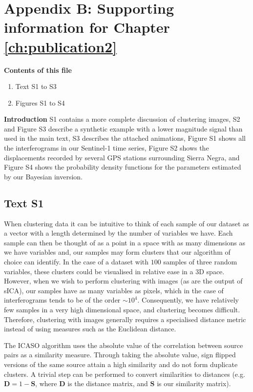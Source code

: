 \onehalfspacing
\chapter*{Appendix B: Supporting information for Chapter \ref{ch:publication2}}


\noindent\textbf{Contents of this file}
\begin{enumerate}
\item Text S1 to S3
\item Figures S1 to S4
\end{enumerate}



\noindent\textbf{Introduction}
S1 contains a more complete discussion of clustering images, S2 and Figure S3 describe a synthetic example with a lower magnitude signal than used in the main text, S3 describes the attached animations, Figure S1 shows all the interferograms in our Sentinel-1 time series, Figure S2 shows the displacements recorded by several GPS stations surrounding Sierra Negra, and Figure S4 shows the probability density functions for the parameters estimated by our Bayesian inversion. 

\section*{Text S1}

When clustering data it can be intuitive to think of each sample of our dataset as a vector with a length determined by the number of variables we have.  Each sample can then be thought of as a point in a space with as many dimensions as we have variables and, our samples may form clusters that our algorithm of choice can identify.  In the case of a dataset with $100$ samples of three random variables, these clusters could be visualised in relative ease in a $3$D space.  However, when we wish to perform clustering with images (as are the output of sICA), our samples have as many variables as pixels, which in the case of interferograms tends to be  of the order $\sim10^{4}$.  Consequently, we have relatively few samples in a very high dimensional space, and clustering becomes difficult.  Therefore, clustering with images generally requires a specialised distance metric instead of using measures such as the Euclidean distance.  

The ICASO algorithm uses the absolute value of the correlation between source pairs as a similarity measure.  Through taking the absolute value, sign flipped versions of the same source attain a high similarity and do not form duplicate clusters.  A trivial step can be performed to convert similarities to distances (e.g. $\textbf{D} = 1 - \textbf{S}$, where $\textbf{D}$ is the distance matrix, and $\textbf{S}$ is our similarity matrix).  


